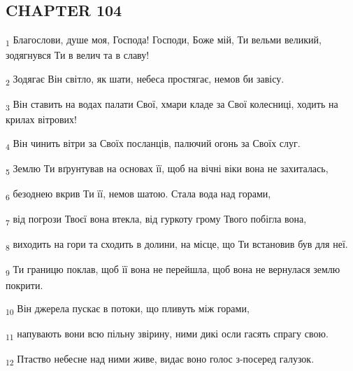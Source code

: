 \subsection{CHAPTER 104}
\begin{tcolorbox}
\textsubscript{1} Благослови, душе моя, Господа! Господи, Боже мій, Ти вельми великий, зодягнувся Ти в велич та в славу!
\end{tcolorbox}
\begin{tcolorbox}
\textsubscript{2} Зодягає Він світло, як шати, небеса простягає, немов би завісу.
\end{tcolorbox}
\begin{tcolorbox}
\textsubscript{3} Він ставить на водах палати Свої, хмари кладе за Свої колесниці, ходить на крилах вітрових!
\end{tcolorbox}
\begin{tcolorbox}
\textsubscript{4} Він чинить вітри за Своїх посланців, палючий огонь за Своїх слуг.
\end{tcolorbox}
\begin{tcolorbox}
\textsubscript{5} Землю Ти вґрунтував на основах її, щоб на вічні віки вона не захиталась,
\end{tcolorbox}
\begin{tcolorbox}
\textsubscript{6} безоднею вкрив Ти її, немов шатою. Стала вода над горами,
\end{tcolorbox}
\begin{tcolorbox}
\textsubscript{7} від погрози Твоєї вона втекла, від гуркоту грому Твого побігла вона,
\end{tcolorbox}
\begin{tcolorbox}
\textsubscript{8} виходить на гори та сходить в долини, на місце, що Ти встановив був для неї.
\end{tcolorbox}
\begin{tcolorbox}
\textsubscript{9} Ти границю поклав, щоб її вона не перейшла, щоб вона не вернулася землю покрити.
\end{tcolorbox}
\begin{tcolorbox}
\textsubscript{10} Він джерела пускає в потоки, що пливуть між горами,
\end{tcolorbox}
\begin{tcolorbox}
\textsubscript{11} напувають вони всю пільну звірину, ними дикі осли гасять спрагу свою.
\end{tcolorbox}
\begin{tcolorbox}
\textsubscript{12} Птаство небесне над ними живе, видає воно голос з-посеред галузок.
\end{tcolorbox}
